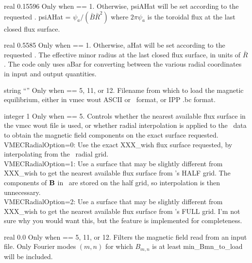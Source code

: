 \myhrule

{real}
{0.15596}
{Only when  == 1. Otherwise, {\ttfamily psiAHat} will be set according to the requested .}
{{\ttfamily psiAHat} = $\psi_a / (\bar{B} \bar{R}^2)$
where $2 \pi \psi_a$ is the toroidal flux at the last closed flux surface.}

\myhrule

{real}
{0.5585}
{Only when  == 1. Otherwise, {\ttfamily aHat} will be set according to the requested .}
{The effective minor radius at the last closed flux surface, in units of $\bar{R}$.
The code only uses {\ttfamily aBar} for converting between the various radial coordinates in input and output quantities.
}

\myhrule

{string}
{``''}
{Only when  == 5, 11, or 12.}
{Filename from which to load the magnetic equilibrium, either in {\ttfamily vmec wout} ASCII or \netCDF~format, or IPP {\ttfamily .bc} format.}

\myhrule

{integer}
{1}
{Only when  == 5.}
{Controls whether the nearest available flux surface in the {\ttfamily vmec wout} file is used, or whether radial interpolation is applied to the \vmec~data
to obtain the magnetic field components on the exact surface requested.\\

{\ttfamily VMECRadialOption}=0: Use the exact {\ttfamily XXX\_wish} flux surface requested, by interpolating from the \vmec~radial grid.\\

{\ttfamily VMECRadialOption}=1: Use a surface that may be slightly different from {\ttfamily XXX\_wish} to get the nearest available flux surface from \vmec's HALF grid.  
   The components of ${\mathbf B}$ in \vmec~are stored on the half grid, so interpolation is then unnecessary.\\

{\ttfamily VMECRadialOption}=2: Use a surface that may be slightly different from {\ttfamily XXX\_wish} to get the nearest available flux surface from \vmec's FULL grid.
I'm not sure why you would want this, but the feature is implemented for completeness.
}

\myhrule

{real}
{0.0}
{Only when  == 5, 11, or 12.}
{Filters the magnetic field read from an input file.  Only Fourier modes $(m,n)$ for which $B_{m,n}$ is at least {\ttfamily min\_Bmn\_to\_load} will be included.}




